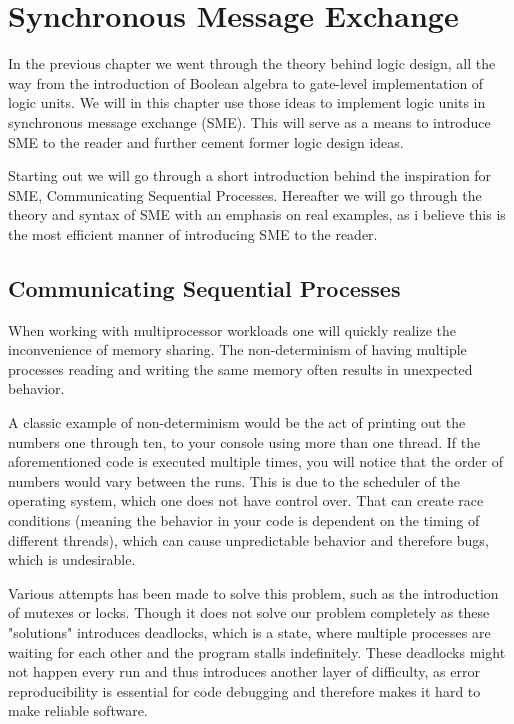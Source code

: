 \chapter{Synchronous Message Exchange}

In the previous chapter we went through the theory behind logic design, all the way from the introduction of Boolean algebra to gate-level implementation of logic units. We will in this chapter use those ideas to implement logic units in synchronous message exchange (SME). This will serve as a means to introduce SME to the reader and further cement former logic design ideas.

Starting out we will go through a short introduction behind the inspiration for SME, Communicating Sequential Processes. Hereafter we will go through the theory and syntax of SME with an emphasis on real examples, as i believe this is the most efficient manner of introducing SME to the reader.  

\section{Communicating Sequential Processes}  
    
    When working with multiprocessor workloads one will quickly realize the inconvenience of memory sharing. The non-determinism of having multiple processes reading and writing the same memory often results in unexpected behavior.
    
    A classic example of non-determinism would be the act of printing out the numbers one through ten, to your console using more than one thread. If the aforementioned code is executed multiple times, you will notice that the order of numbers would vary between the runs. This is due to the scheduler of the operating system, which one does not have control over. That can create race conditions (meaning the behavior in your code is dependent on the timing of different threads), which can cause unpredictable behavior and therefore bugs, which is undesirable.
    
    Various attempts has been made to solve this problem, such as the introduction of mutexes or locks. Though it does not solve our problem completely as these "solutions" introduces deadlocks, which is a state, where multiple processes are waiting for each other and the program stalls indefinitely. These deadlocks might not happen every run and thus introduces another layer of difficulty, as error reproducibility is essential for code debugging and therefore makes it hard to make reliable software.
    
